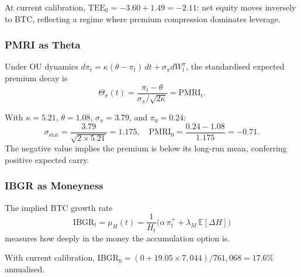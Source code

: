 At current calibration, $\mathrm{TEE}_0 = -3.60 + 1.49 = -2.11$: net equity
moves inversely to BTC, reflecting a regime where premium compression
dominates leverage.

\subsubsection{PMRI as Theta}

\begin{proposition}\label{prop:pmri_theta}
  Under OU dynamics $d\pi_t = \kappa(\theta - \pi_t)\,dt + \sigma_\pi dW_t^\pi$,
  the standardised expected premium decay is
  \begin{equation}
    \Theta_\pi(t)
    = \frac{\pi_t - \theta}{\sigma_\pi / \sqrt{2\kappa}}
    = \mathrm{PMRI}_t.
  \end{equation}
\end{proposition}

With $\kappa = 5.21$, $\theta = 1.08$, $\sigma_\pi = 3.79$, and
$\pi_0 = 0.24$:
\[
  \sigma_{\mathrm{stat}} = \frac{3.79}{\sqrt{2 \times 5.21}} = 1.175,
  \quad
  \mathrm{PMRI}_0 = \frac{0.24 - 1.08}{1.175} = -0.71.
\]
The negative value implies the premium is below its long-run mean,
conferring positive expected carry.

\subsubsection{IBGR as Moneyness}

\begin{proposition}\label{prop:ibgr_moneyness}
  The implied BTC growth rate
  \begin{equation}
    \mathrm{IBGR}_t = \mu_H(t)
    = \frac{1}{H_t}\bigl(\alpha\,\pi_t^+ + \lambda_M\,\mathbb{E}[\Delta H]\bigr)
  \end{equation}
  measures how deeply in the money the accumulation option is.
\end{proposition}

With current calibration, $\mathrm{IBGR}_0 = (0 + 19.05 \times 7{,}044) /
761{,}068 = 17.6\%$ annualised.

